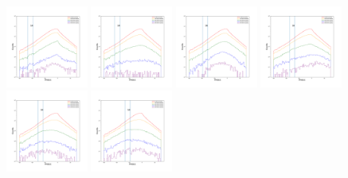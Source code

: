 \documentclass[12pt,prd]{article}
\begin{document}
\begin{figure}[h!]
\centering
\includegraphics[width=0.24\textwidth]{../figures/scanning_plotsgaiascan_l99_0_b50_2_ra224_7_dec60_6_npy_0.pdf}
\includegraphics[width=0.24\textwidth]{../figures/scanning_plotsgaiascan_l99_0_b50_2_ra224_7_dec60_6_npy_1.pdf}
\includegraphics[width=0.24\textwidth]{../figures/scanning_plotsgaiascan_l99_0_b50_2_ra224_7_dec60_6_npy_2.pdf}
\includegraphics[width=0.24\textwidth]{../figures/scanning_plotsgaiascan_l99_0_b50_2_ra224_7_dec60_6_npy_3.pdf}
\includegraphics[width=0.24\textwidth]{../figures/scanning_plotsgaiascan_l99_0_b50_2_ra224_7_dec60_6_npy_4.pdf}
\includegraphics[width=0.24\textwidth]{../figures/scanning_plotsgaiascan_l99_0_b50_2_ra224_7_dec60_6_npy_5.pdf}

\end{figure}
\end{document}

